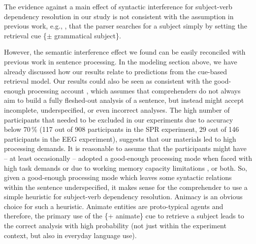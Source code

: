 \documentclass[a4paper, man, floatsintext]{apa7}
\begin{document}
{The evidence against a main effect of syntactic interference for subject-verb dependency resolution in our study is not consistent with the assumption in previous work, e.g., \textcite{vandyke07,mertzen}, that the parser searches for a subject simply by setting the retrieval cue \{$\pm$ grammatical subject\}. \label{future_work} 

However, the semantic interference effect we found can be easily reconciled with previous work in  sentence processing. In the modeling section above, we have already discussed how our results relate to predictions from the \citet{Lewis2005} cue-based retrieval model.  
 Our results could also be seen as consistent with the good-enough processing account \citep{ferreira2007goodenough}, which assumes that comprehenders do not always aim to build a fully fleshed-out analysis of a sentence, but instead might accept incomplete, underspecified, or even incorrect analyses. The high number of participants that needed to be excluded in our experiments due to accuracy below 70\,\% (117 out of 908 participants in the SPR experiment, 29 out of 146 participants in the EEG experiment), suggests that our materials led to high processing demands. It is reasonable to assume that the participants might have -- at least occasionally -- adopted a good-enough processing mode when faced with high task demands \parencite{swets2008underspecification,LogacevMultiple,LogacevVasishthQJEP2016} or due to working memory capacity limitations \parencite{MalsburgVasishth2013}, or both. So, given a good-enough processing mode which leaves some syntactic relations within the sentence underspecified, it makes sense for the comprehender to use a simple heuristic for subject-verb dependency resolution. Animacy is an obvious choice for such a heuristic. Animate entities are proto-typical agents \citep{dowty1991thematic} and therefore, the primary use of the \{+ animate\} cue to retrieve a subject leads to the correct analysis with high probability (not just within the experiment context, but also in everyday language use). 
 
}
\end{document}

